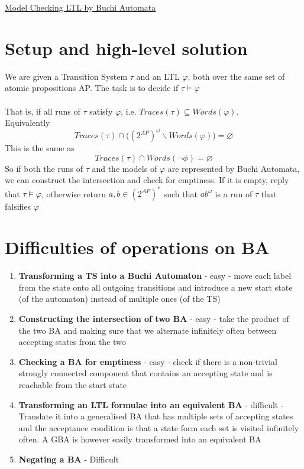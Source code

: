 \documentclass{article}[18pt]
\begin{document}
\begin{center}
\underline{\huge Model Checking LTL by Buchi Automata}
\end{center}
\section{Setup and high-level solution}
We are given a Transition System $\tau$ and an LTL $\varphi$, both over the same set of atomic propositions AP. The task is to decide if $\tau\models\varphi$\\
\\
That is, if all runs of $\tau$ satisfy $\varphi$, i.e. $Traces(\tau)\subseteq Words(\varphi)$.\\
 Equivalently
$$Traces(\tau)\cap \big((2^{AP})^\omega \backslash Words(\varphi)\big)=\varnothing$$
This is the same as
$$Traces(\tau)\cap Words(\lnot \phi)=\varnothing$$
So if both the runs of $\tau$ and the models of $\varphi$ are represented by Buchi Automata, we can construct the intersection and check for emptiness. If it is empty, reply that $\tau\models\varphi$, otherwise return $a,b\in (2^{AP})^*$ such that $ab^\omega$ is a run of $\tau$ that falsifies $\varphi$
\section{Difficulties of operations on BA}
\begin{enumerate}
	\item \textbf{Transforming a TS into a Buchi Automaton} - easy - move each label from the state onto all outgoing transitions and introduce a new start state (of the automaton) instead of multiple ones (of the TS)
	\item \textbf{Constructing the intersection of two BA} - easy - take the product of the two BA and making sure that we alternate infinitely often between accepting states from the two
	\item \textbf{Checking a BA for emptiness} - easy - check if there is a non-trivial strongly connected component that contains an accepting state and is reachable from the start state
	\item \textbf{Transforming an LTL formulae into an equivalent BA} - difficult - Translate it into a generalised BA that has multiple sets of accepting states and the acceptance condition is that a state form each set is visited infinitely often. A GBA is however easily transformed into an equivalent BA
	\item \textbf{Negating a BA} - Difficult
\end{enumerate}
\end{document}
